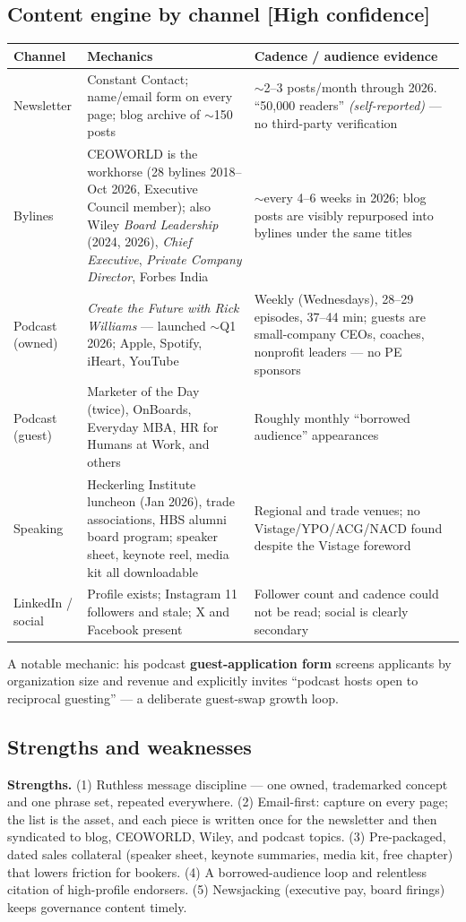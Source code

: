 \documentclass[11pt]{article}
\newcommand{\high}{\textcolor{green!45!black}{\textbf{[High confidence]}}}
\newcommand{\self}{\textcolor{gray!70!black}{\textit{(self-reported)}}}
\begin{document}
\subsection{Content engine by channel \high}
\begin{center}
\renewcommand{\arraystretch}{1.25}
\small
\begin{tabular}{R{2.4cm} R{6.4cm} R{4.4cm}}
\toprule
\textbf{Channel} & \textbf{Mechanics} & \textbf{Cadence / audience evidence} \\
\midrule
Newsletter & Constant Contact; name/email form on every page; blog archive of
$\sim$150 posts & $\sim$2--3 posts/month through 2026. ``50,000 readers'' \self{} ---
no third-party verification \\
Bylines & CEOWORLD is the workhorse (28 bylines 2018--Oct 2026, Executive Council
member); also Wiley \emph{Board Leadership} (2024, 2026), \emph{Chief Executive},
\emph{Private Company Director}, Forbes India & $\sim$every 4--6 weeks in 2026; blog
posts are visibly repurposed into bylines under the same titles \\
Podcast (owned) & \emph{Create the Future with Rick Williams} --- launched $\sim$Q1
2026; Apple, Spotify, iHeart, YouTube & Weekly (Wednesdays), 28--29 episodes, 37--44
min; guests are small-company CEOs, coaches, nonprofit leaders --- no PE sponsors \\
Podcast (guest) & Marketer of the Day (twice), OnBoards, Everyday MBA, HR for Humans
at Work, and others & Roughly monthly ``borrowed audience'' appearances \\
Speaking & Heckerling Institute luncheon (Jan 2026), trade associations, HBS alumni
board program; speaker sheet, keynote reel, media kit all downloadable & Regional and
trade venues; no Vistage/YPO/ACG/NACD found despite the Vistage foreword \\
LinkedIn / social & Profile exists; Instagram 11 followers and stale; X and Facebook
present & Follower count and cadence could not be read; social is clearly secondary \\
\bottomrule
\end{tabular}
\end{center}

A notable mechanic: his podcast \textbf{guest-application form} screens applicants by
organization size and revenue and explicitly invites ``podcast hosts open to reciprocal
guesting'' --- a deliberate guest-swap growth loop.

\subsection{Strengths and weaknesses}
\textbf{Strengths.} (1) Ruthless message discipline --- one owned, trademarked concept
and one phrase set, repeated everywhere. (2) Email-first: capture on every page; the
list is the asset, and each piece is written once for the newsletter and then
syndicated to blog, CEOWORLD, Wiley, and podcast topics. (3) Pre-packaged, dated sales
collateral (speaker sheet, keynote summaries, media kit, free chapter) that lowers
friction for bookers. (4) A borrowed-audience loop and relentless citation of
high-profile endorsers. (5) Newsjacking (executive pay, board firings) keeps governance
content timely.
\end{document}

